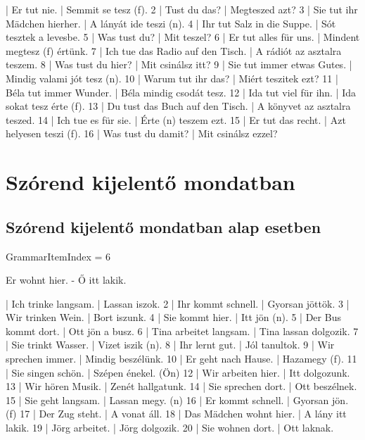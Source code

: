 \documentclass{article}
\newenvironment{desc}{\verbatim}{\endverbatim}
\newenvironment{exmp}{\verbatim}{\endverbatim}
\begin{document}
\begin{exmp}
1 | Er tut nie. | Semmit se tesz (f).
2 | Tust du das? | Megteszed azt?
3 | Sie tut ihr Mädchen hierher. | A lányát ide teszi (n).
4 | Ihr tut Salz in die Suppe. | Sót tesztek a levesbe.
5 | Was tust du? | Mit teszel?
6 | Er tut alles für uns. | Mindent megtesz (f) értünk.
7 | Ich tue das Radio auf den Tisch. | A rádiót az asztalra teszem.
8 | Was tust du hier? | Mit csinálsz itt?
9 | Sie tut immer etwas Gutes. | Mindig valami jót tesz (n).
10 | Warum tut ihr das? | Miért teszitek ezt?
11 | Béla tut immer Wunder. | Béla mindig csodát tesz.
12 | Ida tut viel für ihn. | Ida sokat tesz érte (f).
13 | Du tust das Buch auf den Tisch. | A könyvet az asztalra teszed.
14 | Ich tue es für sie. | Érte (n) teszem ezt.
15 | Er tut das recht. | Azt helyesen teszi (f).
16 | Was tust du damit? | Mit csinálsz ezzel?
\end{exmp}

\section{Szórend kijelentő mondatban}

\subsection{Szórend kijelentő mondatban alap esetben}

GrammarItemIndex = 6

\begin{desc}
Er wohnt hier. - Ő itt lakik.
\end{desc}

\begin{exmp}
1 | Ich trinke langsam. | Lassan iszok.
2 | Ihr kommt schnell. | Gyorsan jöttök.
3 | Wir trinken Wein. | Bort iszunk.
4 | Sie kommt hier. | Itt jön (n).
5 | Der Bus kommt dort. | Ott jön a busz.
6 | Tina arbeitet langsam. | Tina lassan dolgozik.
7 | Sie trinkt Wasser. | Vizet iszik (n).
8 | Ihr lernt gut. | Jól tanultok.
9 | Wir sprechen immer. | Mindig beszélünk.
10 | Er geht nach Hause. | Hazamegy (f).
11 | Sie singen schön. | Szépen énekel. (Ön)
12 | Wir arbeiten hier. | Itt dolgozunk.
13 | Wir hören Musik. | Zenét hallgatunk.
14 | Sie sprechen dort. | Ott beszélnek.
15 | Sie geht langsam. | Lassan megy. (n)
16 | Er kommt schnell. | Gyorsan jön. (f)
17 | Der Zug steht. | A vonat áll.
18 | Das Mädchen wohnt hier. | A lány itt lakik.
19 | Jörg arbeitet. | Jörg dolgozik.
20 | Sie wohnen dort. | Ott laknak.
\end{exmp}
\end{document}
